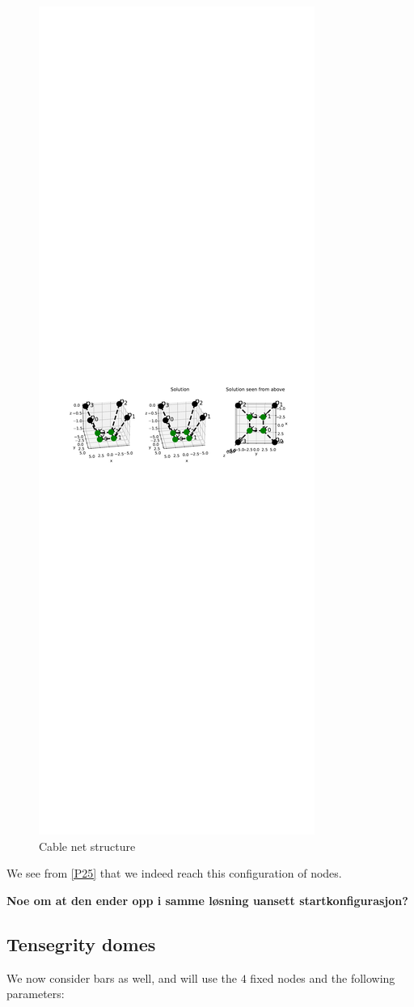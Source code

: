 \begin{figure}
    \centering
    \includegraphics[width=0.6\columnwidth]{Bilder/P25.pdf}
    \caption{Cable net structure}
    \label{P25}
\end{figure}
We see from \eqref{P25} that we indeed reach this configuration of nodes. 

\textbf{Noe om at den ender opp i samme løsning uansett startkonfigurasjon?}

\subsection{Tensegrity domes}
We now consider bars as well, and will use the $4$ fixed nodes and the following parameters:

